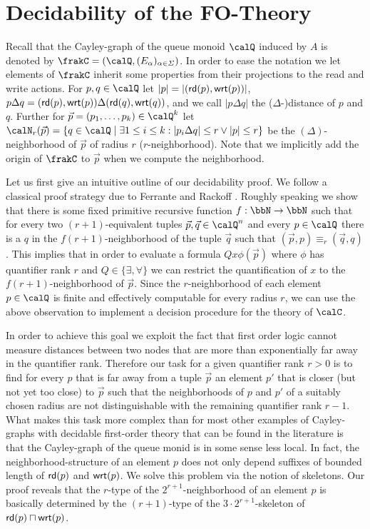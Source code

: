 \section{Decidability of the FO-Theory}
Recall that the Cayley-graph of the queue monoid $\Qx$ induced by $A$ is denoted by $\frakC=(\Qx,(E_\alpha)_{\alpha\in\Sigma})$.
In order to ease the notation we let elements of $\frakC$ inherit some properties from their projections to the read and write actions. 
For $p,q\in \Qx$ let $|p| = |(\mathsf{rd}(p), \mathsf{wrt}(p))|$, $p\Delta q = (\mathsf{rd}(p), \mathsf{wrt}(p))\Delta (\mathsf{rd}(q), \mathsf{wrt}(q))$, and we call $|p\Delta q|$ the ($\Delta$-)distance of $p$ and $q$. Further for $\vec{p} = (p_1,\ldots,p_k)\in \Qx^k$ let 
$\calN_r(\vec{p}) = \{ q\in \Qx \mid \exists 1\leq i \leq k: |p_i\Delta q| \leq  r  \vee  |p| \leq r \}$ be the $(\Delta)$-neighborhood of $\vec{p}$ of radius $r$ ($r$-neighborhood). Note that we implicitly add the origin
of $\frakC$ to $\vec{p}$ when we compute the neighborhood.

Let us first give an intuitive outline of our decidability proof. We follow a classical proof strategy due to Ferrante and Rackoff \cite{FerR79}. Roughly speaking  we show that there is some fixed primitive recursive function $f:\bbN \to \bbN$ such that for every
two $({r+1})$-equivalent tuples $\vec{p},\vec{q} \in \Qx^n$ and every $p\in \Qx$ there is a $q$ in the $f(r+1)$-neighborhood of the tuple $\vec{q}$ such that $(\vec{p},p) \equiv_r (\vec{q}, q)$.
This implies that in order to evaluate a formula $Qx\phi(\vec{p})$ where $\phi$ has quantifier rank $r$ and $Q\in\{\exists,\forall\}$  we can restrict the quantification of $x$ to the $f(r+1)$-neighborhood of $\vec{p}$. Since the
$r$-neighborhood of each element $p\in \Qx$ is finite and effectively computable for every radius $r$, we can use the above observation to implement a decision procedure for the theory of $\calC$.   

In order to achieve this goal we exploit the fact that first order logic cannot measure distances between two nodes that are more than exponentially far away in the quantifier rank. Therefore our task for a given quantifier rank $r>0$ is to find for every $p$ that is far away from a tuple $\vec{p}$ an element $p'$ that is closer (but not yet too close) to $\vec{p}$ such that the neighborhoods of $p$ and $p'$ of a suitably chosen radius are not distinguishable with the remaining quantifier rank $r-1$. What makes this task more complex than for most other examples of Cayley-graphs with decidable first-order theory that can be found in the literature is that the Cayley-graph of the queue monid is in some sense less local.
In fact, the neighborhood-structure of an element $p$ does not only depend suffixes of  bounded length of $\mathsf{rd}(p)$ and $\mathsf{wrt}(p)$. We solve this problem via the notion of skeletons. Our proof 
reveals that   the $r$-type of the $2^{r+1}$-neighborhood of an element $p$ is basically determined by the $(r+1)$-type of the $3\cdot 2^{r+1}$-skeleton of $\mathsf{rd}(p) \sqcap \mathsf{wrt}(p)$. 


